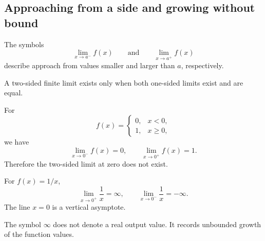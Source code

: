 \subsection{Approaching from a side and growing without bound}

\begin{definitionbox}
The symbols
\[
\lim_{x\to a^-}f(x)
\qquad\text{and}\qquad
\lim_{x\to a^+}f(x)
\]
describe approach from values smaller and larger than $a$, respectively.
\end{definitionbox}

A two-sided finite limit exists only when both one-sided limits exist and are equal.

\begin{examplebox}[A jump]
For
\[
f(x)=\begin{cases}0,&x<0,\\1,&x\ge0,\end{cases}
\]
we have
\[
\lim_{x\to0^-}f(x)=0,
\qquad
\lim_{x\to0^+}f(x)=1.
\]
Therefore the two-sided limit at zero does not exist.
\end{examplebox}

\begin{examplebox}
For $f(x)=1/x$,
\[
\lim_{x\to0^+}\frac1x=\infty,
\qquad
\lim_{x\to0^-}\frac1x=-\infty.
\]
The line $x=0$ is a vertical asymptote.
\end{examplebox}

\begin{interpretationbox}
The symbol $\infty$ does not denote a real output value. It records unbounded growth of the function values.
\end{interpretationbox}
